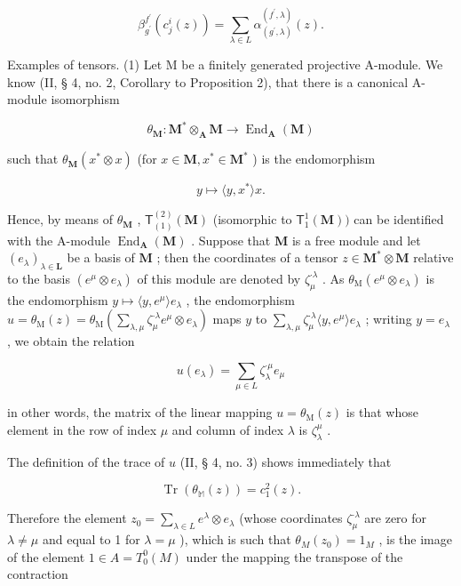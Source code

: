 \[
\beta_ {g ^ {\prime}} ^ {f ^ {\prime}} (c _ {j} ^ {i} (z)) = \sum_ {\lambda \in L} \alpha_ {(g ^ {\prime}, \lambda)} ^ {(f ^ {\prime}, \lambda)} (z).\tag{17}
\]

Examples of tensors. (1) Let M be a finitely generated projective A-module. We know (II, § 4, no. 2, Corollary to Proposition 2), that there is a canonical A-module isomorphism

\[
\theta_ {\mathbf {M}} \colon \mathbf {M} ^ {*} \otimes_ {\mathbf {A}} \mathbf {M} \rightarrow \operatorname{End} _ {\mathbf {A}} (\mathbf {M})
\]

such that \(\theta_{\mathbf{M}}(x^{*}\otimes x)\) (for \(x\in \mathbf{M},x^{*}\in \mathbf{M}^{*}\) ) is the endomorphism

\[
y \mapsto \langle y, x ^ {*} \rangle x.
\]

Hence, by means of \(\theta_{\mathbf{M}}\) , \(\mathsf{T}_{(1)}^{(2)}(\mathbf{M})\) (isomorphic to \(\mathsf{T}_1^1 (\mathbf{M}))\) can be identified with the A-module \(\operatorname{End}_{\mathbf{A}}(\mathbf{M})\) . Suppose that \(\mathbf{M}\) is a free module and let \((e_{\lambda})_{\lambda \in \mathbf{L}}\) be a basis of \(\mathbf{M}\) ; then the coordinates of a tensor \(z\in \mathbf{M}^*\otimes \mathbf{M}\) relative to the basis \((e^{\mu}\otimes e_{\lambda})\) of this module are denoted by \(\zeta_{\mu}^{\cdot \lambda}\) . As \(\theta_{\mathrm{M}}(e^{\mu}\otimes e_{\lambda})\) is the endomorphism \(y\mapsto \langle y,e^{\mu}\rangle e_{\lambda}\) , the endomorphism \(u = \theta_{\mathrm{M}}(z) = \theta_{\mathrm{M}}\left(\sum_{\lambda ,\mu}\zeta_{\mu}^{\cdot \lambda}e^{\mu}\otimes e_{\lambda}\right)\) maps \(y\) to \(\sum_{\lambda ,\mu}\zeta_{\mu}^{\cdot \lambda}\langle y,e^{\mu}\rangle e_{\lambda}\) ; writing \(y = e_{\lambda}\) , we obtain the relation

\[
u (e _ {\lambda}) = \sum_ {\mu \in L} \zeta_ {\lambda} ^ {\cdot \mu} e _ {\mu}\tag{18}
\]

in other words, the matrix of the linear mapping \(u = \theta_{\mathrm{M}}(z)\) is that whose element in the row of index \(\mu\) and column of index \(\lambda\) is \(\zeta_{\lambda}^{\mu}\) .

The definition of the trace of \(u\) (II, § 4, no. 3) shows immediately that

\[
\operatorname{Tr} (\theta_ {\mathbb {M}} (z)) = c _ {1} ^ {2} (z).
\]

Therefore the element \(z_0 = \sum_{\lambda \in L} e^\lambda \otimes e_\lambda\) (whose coordinates \(\zeta_\mu^{\cdot \lambda}\) are zero for \(\lambda \neq \mu\) and equal to 1 for \(\lambda = \mu\) ), which is such that \(\theta_M(z_0) = 1_M\) , is the image of the element \(1 \in A = T_0^0(M)\) under the mapping the transpose of the contraction

